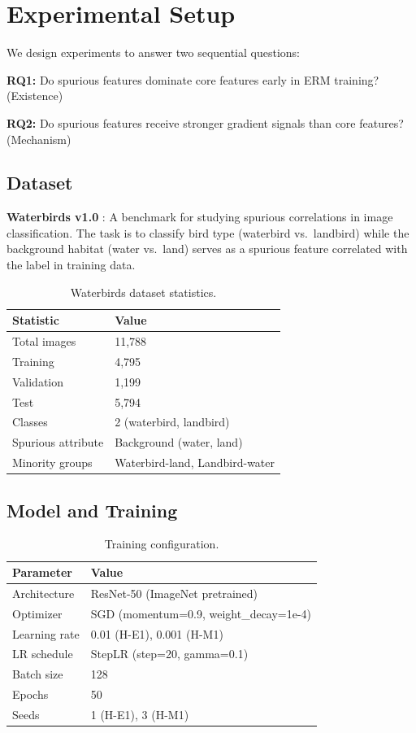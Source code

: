 \section{Experimental Setup}

We design experiments to answer two sequential questions:

\textbf{RQ1:} Do spurious features dominate core features early in ERM training? (Existence)

\textbf{RQ2:} Do spurious features receive stronger gradient signals than core features? (Mechanism)

\subsection{Dataset}

\textbf{Waterbirds v1.0} \citep{sagawa2020distributionally}: A benchmark for studying spurious correlations in image classification. The task is to classify bird type (waterbird vs.\ landbird) while the background habitat (water vs.\ land) serves as a spurious feature correlated with the label in training data.

\begin{table}[h]
\centering
\begin{tabular}{@{}ll@{}}
\toprule
Statistic & Value \\
\midrule
Total images & 11,788 \\
Training & 4,795 \\
Validation & 1,199 \\
Test & 5,794 \\
Classes & 2 (waterbird, landbird) \\
Spurious attribute & Background (water, land) \\
Minority groups & Waterbird-land, Landbird-water \\
\bottomrule
\end{tabular}
\caption{Waterbirds dataset statistics.}
\label{tab:dataset}
\end{table}

\subsection{Model and Training}

\begin{table}[h]
\centering
\begin{tabular}{@{}ll@{}}
\toprule
Parameter & Value \\
\midrule
Architecture & ResNet-50 (ImageNet pretrained) \\
Optimizer & SGD (momentum=0.9, weight\_decay=1e-4) \\
Learning rate & 0.01 (H-E1), 0.001 (H-M1) \\
LR schedule & StepLR (step=20, gamma=0.1) \\
Batch size & 128 \\
Epochs & 50 \\
Seeds & 1 (H-E1), 3 (H-M1) \\
\bottomrule
\end{tabular}
\caption{Training configuration.}
\label{tab:training}
\end{table}

